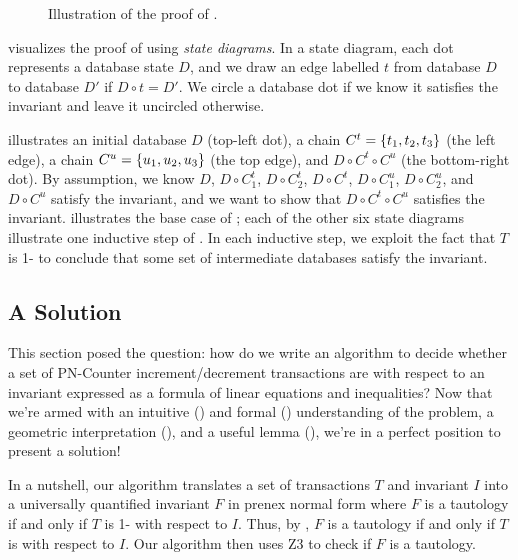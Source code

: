 \begin{figure}[h]
  \caption{Illustration of the proof of .}
  \label{fig:one-is-enough}
\end{figure}

 visualizes the proof of  using
\emph{state diagrams}. In a state diagram, each dot represents a database state
$D$, and we draw an edge labelled $t$ from database $D$ to database $D'$ if $D
\circ t = D'$. We circle a database dot if we know it satisfies the invariant
and leave it uncircled otherwise.

 illustrates an initial database $D$ (top-left dot), a
chain $C^t = \left\{t_1, t_2, t_3\right\}$ (the left edge), a chain $C^u = \left\{u_1,
u_2, u_3\right\}$ (the top edge), and $D \circ C^t \circ C^u$ (the bottom-right dot).
By assumption, we know $D$, $D \circ C^t_1$, $D \circ C^t_2$, $D \circ C^t$, $D
\circ C^u_1$, $D \circ C^u_2$, and $D \circ C^u$ satisfy the invariant, and we
want to show that $D \circ C^t \circ C^u$ satisfies the invariant.
 illustrates the base case of
; each of the other six state diagrams illustrate one
inductive step of . In each inductive step, we exploit
the fact that $T$ is 1-\iconfluent{} to conclude that some set of intermediate
databases satisfy the invariant.

\subsection{A Solution}\label{sec:solution}
This section posed the question: how do we write an algorithm to decide whether
a set of PN-Counter increment/decrement transactions are \iconfluent{} with
respect to an invariant expressed as a formula of linear equations and
inequalities?  Now that we're armed with an intuitive
() and formal ()
understanding of the problem, a geometric interpretation
(), and a useful lemma (), we're
in a perfect position to present a solution!

In a nutshell, our algorithm translates a set of transactions $T$ and invariant
$I$ into a universally quantified invariant $F$ in prenex normal form where $F$
is a tautology if and only if $T$ is 1-\iconfluent{} with respect to $I$. Thus,
by , $F$ is a tautology if and only if $T$ is
\iconfluent{} with respect to $I$. Our algorithm then uses Z3 \cite{de2008z3}
to check if $F$ is a tautology.

